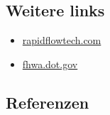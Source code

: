 \documentclass[
]{book}
\providecommand{\tightlist}{%
  \setlength{\itemsep}{0pt}\setlength{\parskip}{0pt}}
\begin{document}
\hypertarget{weitere-links-12}{%
\subsection*{Weitere links}\label{weitere-links-12}}

\begin{itemize}
\tightlist
\item
  \href{https://www.rapidflowtech.com/surtrac}{rapidflowtech.com}
\item
  \href{https://www.fhwa.dot.gov/innovation/everydaycounts/edc-1/asct.cfm}{fhwa.dot.gov}
\end{itemize}

\hypertarget{referenzen-15}{%
\subsection*{Referenzen}\label{referenzen-15}}
\end{document}
